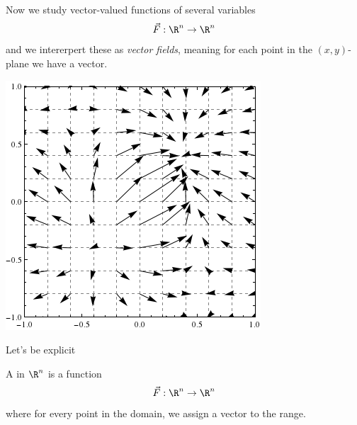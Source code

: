 \documentclass{ximera}
\begin{document}
Now we study vector-valued functions of several variables
\[
\vec{F}:\R^n\to \R^n
\]
and we intererpert these as \textit{vector fields}, meaning for each
point in the $(x,y)$-plane we have a vector.
\begin{image}
  \includegraphics{egField.png}
\end{image}


Let's be explicit
\begin{definition}
  A  in $\R^n$ is a function
  \[
  \vec{F}: \R^n\to\R^n
  \]
  where for every point in the domain, we assign a vector to the range. 
\end{definition}
\end{document}
